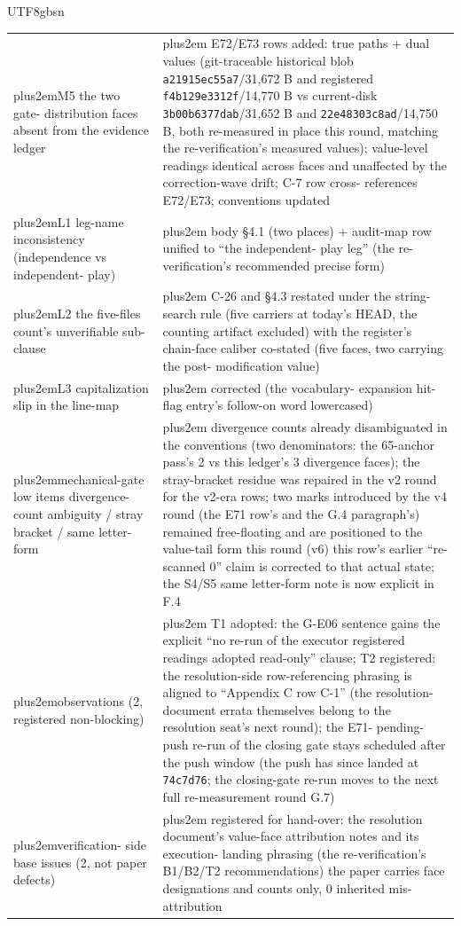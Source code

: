 \documentclass[11pt,letterpaper]{article}
\newcommand{\RaggedRight}{\rightskip=0pt plus2em\relax}
\begin{document}
\begin{CJK}{UTF8}{gbsn}
{\begin{longtable}{>{\RaggedRight\arraybackslash}p{6.85cm} >{\RaggedRight\arraybackslash}p{6.85cm}}
M5 \textemdash{} the two gate-\penalty-100 distribution faces absent from the evidence ledger & E72/E73 rows added: true paths + dual values (git-traceable historical blob \texttt{a21915ec55a7}/31,672 B and registered \texttt{f4b129e3312f}/14,770 B vs current-disk \texttt{3b00b6377dab}/31,652 B and \texttt{22e48303c8ad}/14,750 B, both re-measured in place this round, matching the re-verification's measured values); value-level readings identical across faces and unaffected by the correction-wave drift; C-7 row cross-\penalty-100 references E72/E73; conventions updated \\
L1 \textemdash{} leg-name inconsistency (independence vs independent-\penalty-100 play) & body \S{}4.1 (two places) + audit-map row unified to ``the independent-\penalty-100 play leg'' (the re-verification's recommended precise form) \\
L2 \textemdash{} the five-files count's unverifiable sub-clause & C-26 and \S{}4.3 restated under the string-search rule (five carriers at today's HEAD, the counting artifact excluded) with the register's chain-face caliber co-stated (five faces, two carrying the post-\penalty-100 modification value) \\
L3 \textemdash{} capitalization slip in the line-map & corrected (the vocabulary-\penalty-100 expansion hit-flag entry's follow-on word lowercased) \\
mechanical-gate low items \textemdash{} divergence-\penalty-100 count ambiguity / stray bracket / same letter-form & divergence counts already disambiguated in the conventions (two denominators: the 65-anchor pass's 2 vs this ledger's 3 divergence faces); the stray-bracket residue was repaired in the v2 round for the v2-era rows; two marks introduced by the v4 round (the E71 row's and the G.4 paragraph's) remained free-floating and are positioned to the value-tail form this round (v6) \textemdash{} this row's earlier ``re-scanned 0'' claim is corrected to that actual state; the S4/S5 same letter-form note is now explicit in F.4 \\
observations (2, registered non-blocking) & T1 adopted: the G-E06 sentence gains the explicit ``no re-run of the executor \textemdash{} registered readings adopted read-only'' clause; T2 registered: the resolution-side row-referencing phrasing is aligned to ``Appendix C row C-1'' (the resolution-\penalty-100 document errata themselves belong to the resolution seat's next round); the E71-\penalty-100 pending-\penalty-100 push re-run of the closing gate stays scheduled after the push window (the push has since landed at \texttt{74c7d76}; the closing-gate re-run moves to the next full re-measurement round \textemdash{} G.7) \\
verification-\penalty-100 side base issues (2, not paper defects) & registered for hand-over: the resolution document's value-face attribution notes and its execution-\penalty-100 landing phrasing (the re-verification's B1/B2/T2 recommendations) \textemdash{} the paper carries face designations and counts only, 0 inherited mis-attribution \\
\end{longtable}}


\end{CJK}
\end{document}
